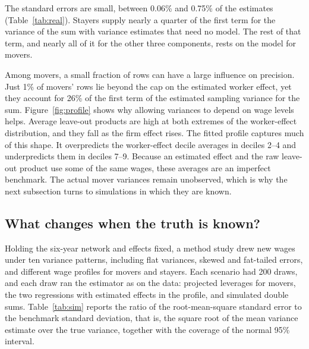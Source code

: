 The standard errors are small, between 0.06\% and 0.75\% of the estimates
(Table~\ref{tab:real}). Stayers supply nearly a quarter of the first term for the
variance of the sum with variance estimates that need no model. The rest of that term,
and nearly all of it for the other three components, rests on the model for movers.

Among movers, a small fraction of rows can have a large influence on
precision. Just 1\% of movers' rows lie beyond the cap on the estimated
worker effect, yet they account for 26\% of the first term of the estimated
sampling variance for the sum. Figure~\ref{fig:profile} shows why allowing
variances to depend on wage levels helps. Average leave-out products are
high at both extremes of the worker-effect distribution, and they fall as
the firm effect rises. The fitted profile captures much of this shape.
It overpredicts the worker-effect decile averages in deciles 2--4 and
underpredicts them in deciles 7--9. Because an estimated effect and the
raw leave-out product use some of the same wages, these averages are an
imperfect benchmark. The actual mover variances remain unobserved, which is why the
next subsection turns to simulations in which they are known.



\subsection{What changes when the truth is known?}\label{sec:sim}
Holding the six-year network and effects fixed, a method study drew new wages
under ten variance patterns, including flat variances, skewed and fat-tailed errors,
and different wage profiles for movers and stayers. Each scenario had 200 draws, and
each draw ran the estimator as on the data: projected leverages for movers, the two
regressions with estimated effects in the profile, and simulated double sums.
Table~\ref{tab:sim} reports the ratio of the root-mean-square standard error to the
benchmark standard deviation, that is, the square root of the mean variance estimate
over the true variance, together with the coverage of the normal 95\% interval.

